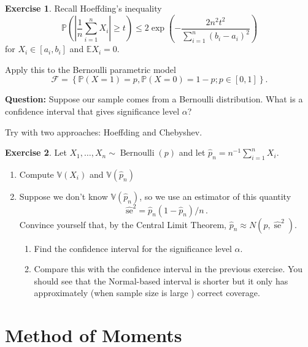 \documentclass[
  openany]{book}
\theoremstyle{definition}
\theoremstyle{definition}
\theoremstyle{definition}
\newtheorem{exercise}{Exercise}[chapter]
\theoremstyle{definition}
\theoremstyle{remark}
\begin{document}
\begin{exercise}
Recall Hoeffding's inequality
\[ \mathbb{P}\left( \left| \frac{1}{n}\sum_{i=1}^n X_i \right| \geq t \right) 
\leq 2  \exp\left( - \frac{2 n^2 t^2}{\sum_{i=1}^n (b_i - a_i)^2}   \right) \]
for \(X_i \in [a_i, b_i]\) and \(\mathbb{E}X_i = 0\).

Apply this to the Bernoulli parametric model
\[\mathcal{F} = \left\{ \mathbb{P}(X= 1) = p, \mathbb{P}(X = 0) = 1-p; p \in [0,1]   \right\}.\]

\textbf{Question:} Suppose our sample comes from a Bernoulli distribution.
What is a confidence interval that gives significance level \(\alpha\)?

Try with two approaches: Hoeffding and Chebyshev.
\end{exercise}

\begin{exercise}

Let \(X_1, \ldots, X_n \sim \operatorname{Bernoulli}(p)\) and let \(\widehat{p}_n=n^{-1} \sum_{i=1}^n X_i\).

\begin{enumerate}
\def\labelenumi{\arabic{enumi}.}
\item
  Compute \(\mathbb{V}( X_i)\) and \(\mathbb{V}(\hat p_n)\)
\item
  Suppose we don't know \(\mathbb{V}(\hat p_n)\), so we use an estimator of this quantity
  \[\widehat{\mathrm{se}}^2 = {\widehat{p}_n\left(1-\widehat{p}_n\right) / n} \,.\]
  Convince yourself that, by the Central Limit Theorem, \(\widehat{p}_n \approx N\left(p, \widehat{\operatorname{se}}^2\right)\).

  \begin{enumerate}
  \def\labelenumii{\arabic{enumii}.}
  \item
    Find the confidence interval for the significance level \(\alpha\).
  \item
    Compare this with the confidence interval in the previous exercise.
    You should see that the Normal-based interval is shorter but it only has approximately (when sample size is large ) correct coverage.
  \end{enumerate}
\end{enumerate}

\end{exercise}

\hypertarget{method-of-moments}{%
\section{Method of Moments}\label{method-of-moments}}
\end{document}

